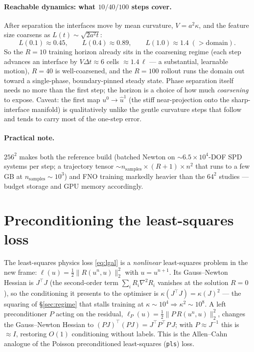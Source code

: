 \documentclass[11pt]{article}
\newcommand{\dt}{\Delta t}
\newcommand{\uhat}{\hat u}
\begin{document}
\paragraph{Reachable dynamics: what $10/40/100$ steps cover.}
After separation the interfaces move by mean curvature, $V=a^2\kappa$, and the feature size
coarsens as $L(t)\sim\sqrt{2a^2t}$:
\[
  L(0.1)\approx0.45,\qquad L(0.4)\approx0.89,\qquad L(1.0)\approx1.4\;(>\text{domain}).
\]
So the $R=10$ training horizon already sits in the coarsening regime (each step advances an
interface by $V\dt\approx6$ cells $\approx1.4\,\ell$ --- a substantial, learnable motion), $R=40$
is well-coarsened, and the $R=100$ rollout runs the domain out toward a single-phase,
boundary-pinned steady state. Phase separation itself needs no more than the first step; the
horizon is a choice of how much \emph{coarsening} to expose. Caveat: the first map
$u^0\!\to\!\uhat^1$ (the stiff near-projection onto the sharp-interface manifold) is qualitatively
unlike the gentle curvature steps that follow and tends to carry most of the one-step error.

\paragraph{Practical note.} $256^2$ makes both the reference build (batched Newton on
$\sim6.5\times10^4$-DOF SPD systems per step; a trajectory tensor
$\sim n_{\text{samples}}\times(R{+}1)\times n^2$ that runs to a few GB at
$n_{\text{samples}}\sim10^3$) and FNO training markedly heavier than the $64^2$ studies --- budget
storage and GPU memory accordingly.

\section{Preconditioning the least-squares loss}
\label{sec:precond}

The least-squares physics loss \eqref{eq:lgal} is a \emph{nonlinear} least-squares problem in the
new frame: $\ell(u)=\tfrac12\|R(u^n,u)\|_2^2$ with $u=u^{n+1}$. Its Gauss--Newton Hessian is
$J^\top J$ (the second-order term $\sum_i R_i\nabla^2R_i$ vanishes at the solution $R=0$), so the
conditioning it presents to the optimiser is $\kappa(J^\top J)=\kappa(J)^2$ --- the squaring of
\S\ref{sec:regime} that stalls training at $\kappa\sim10^4\Rightarrow\kappa^2\sim10^8$. A left
preconditioner $P$ acting on the residual, $\ell_P(u)=\tfrac12\|P\,R(u^n,u)\|_2^2$, changes the
Gauss--Newton Hessian to $(PJ)^\top(PJ)=J^\top P^\top P\,J$; with $P\approx J^{-1}$ this is
$\approx I$, restoring $O(1)$ conditioning without labels. This is the Allen--Cahn analogue of the
Poisson preconditioned least-squares (\texttt{pls}) loss.
\end{document}
